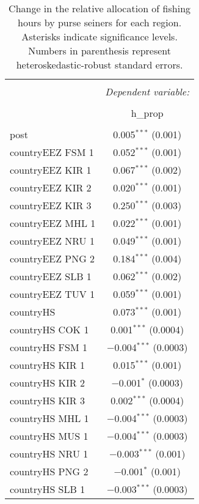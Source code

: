 \documentclass[12pt,]{article}
\begin{document}
\begin{table}[!htbp] \centering 
  \caption{\label{tab:disp_mod}Change in the relative allocation of fishing hours by purse seiners for each region. Asterisks indicate significance levels. Numbers in parenthesis represent heteroskedastic-robust standard errors.} 
  \label{} 
\begin{tabular}{@{\extracolsep{5pt}}lc} 
\\[-1.8ex]\hline 
\hline \\[-1.8ex] 
 & \multicolumn{1}{c}{\textit{Dependent variable:}} \\ 
\cline{2-2} 
\\[-1.8ex] & h\_prop \\ 
\hline \\[-1.8ex] 
 post & 0.005$^{***}$ (0.001) \\ 
  countryEEZ FSM 1 & 0.052$^{***}$ (0.001) \\ 
  countryEEZ KIR 1 & 0.067$^{***}$ (0.002) \\ 
  countryEEZ KIR 2 & 0.020$^{***}$ (0.001) \\ 
  countryEEZ KIR 3 & 0.250$^{***}$ (0.003) \\ 
  countryEEZ MHL 1 & 0.022$^{***}$ (0.001) \\ 
  countryEEZ NRU 1 & 0.049$^{***}$ (0.001) \\ 
  countryEEZ PNG 2 & 0.184$^{***}$ (0.004) \\ 
  countryEEZ SLB 1 & 0.062$^{***}$ (0.002) \\ 
  countryEEZ TUV 1 & 0.059$^{***}$ (0.001) \\ 
  countryHS & 0.073$^{***}$ (0.001) \\ 
  countryHS COK 1 & 0.001$^{***}$ (0.0004) \\ 
  countryHS FSM 1 & $-$0.004$^{***}$ (0.0003) \\ 
  countryHS KIR 1 & 0.015$^{***}$ (0.001) \\ 
  countryHS KIR 2 & $-$0.001$^{*}$ (0.0003) \\ 
  countryHS KIR 3 & 0.002$^{***}$ (0.0004) \\ 
  countryHS MHL 1 & $-$0.004$^{***}$ (0.0003) \\ 
  countryHS MUS 1 & $-$0.004$^{***}$ (0.0003) \\ 
  countryHS NRU 1 & $-$0.003$^{***}$ (0.001) \\ 
  countryHS PNG 2 & $-$0.001$^{*}$ (0.001) \\ 
  countryHS SLB 1 & $-$0.003$^{***}$ (0.0003) \\ 

\end{tabular}
\end{table}
\end{document}
